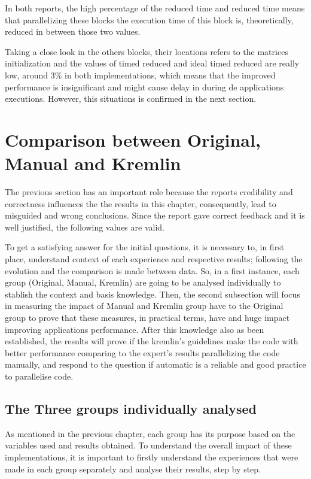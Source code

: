In both reports, the high percentage of the reduced time and reduced time means that parallelizing these blocks the execution time of this block is, theoretically, reduced in between those two values. 

Taking a close look in the others blocks, their locations refers to the matrices initialization and the values of timed reduced and ideal timed reduced are really low, around 3\% in both implementations, which means that the improved performance is insignificant and might cause delay in during de applications executions. However, this situations is confirmed in the next section. 


\section{Comparison between Original, Manual and Kremlin}

The previous section has an important role because the reports credibility and correctness influences the the results in this chapter, consequently, lead to misguided and wrong conclusions. Since the report gave correct feedback and it is well justified, the following values are valid.

To get a satisfying answer for the initial questions, it is necessary to, in first place, understand context of each experience and respective results; following the evolution and the comparison is made between data. So, in a first instance, each group (Original, Manual, Kremlin) are going to be analysed individually to stablish the context and basis knowledge. Then, the second subsection will focus in measuring the impact of Manual and Kremlin group have to the Original group to prove that these measures, in practical terms, have and huge impact improving applications performance. After this knowledge also as been established, the results will prove if the kremlin's guidelines make the code with better performance comparing to the expert's results parallelizing the code manually, and respond to the question if  automatic is a reliable and good practice to parallelise code.

\subsection{The Three groups individually analysed}

As mentioned in the previous chapter, each group has its purpose
based on the variables used and results obtained. To understand the overall impact of these implementations, it is important to firstly understand the experiences that were made in each group separately and analyse their results, step by step.

